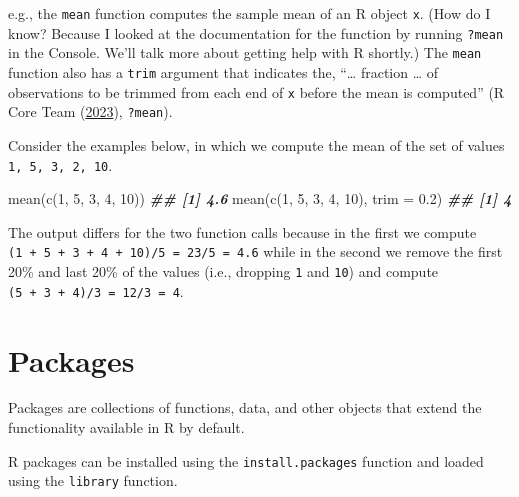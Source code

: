\documentclass[
]{book}
\newenvironment{Shaded}{\begin{snugshade}}{\end{snugshade}}
\newcommand{\AttributeTok}[1]{\textcolor[rgb]{0.77,0.63,0.00}{#1}}
\newcommand{\DecValTok}[1]{\textcolor[rgb]{0.00,0.00,0.81}{#1}}
\newcommand{\DocumentationTok}[1]{\textcolor[rgb]{0.56,0.35,0.01}{\textbf{\textit{#1}}}}
\newcommand{\FloatTok}[1]{\textcolor[rgb]{0.00,0.00,0.81}{#1}}
\newcommand{\FunctionTok}[1]{\textcolor[rgb]{0.00,0.00,0.00}{#1}}
\newcommand{\NormalTok}[1]{#1}
\theoremstyle{definition}
\theoremstyle{definition}
\theoremstyle{definition}
\theoremstyle{definition}
\theoremstyle{remark}
\begin{document}
e.g., the \texttt{mean} function computes the sample mean of an R object \texttt{x}. (How do I know? Because I looked at the documentation for the function by running \texttt{?mean} in the Console. We'll talk more about getting help with R shortly.) The \texttt{mean} function also has a \texttt{trim} argument that indicates the, ``\ldots{} fraction \ldots{} of observations to be trimmed from each end of \texttt{x} before the mean is computed'' (R Core Team (\protect\hyperlink{ref-R-base}{2023}), \texttt{?mean}).

Consider the examples below, in which we compute the mean of the set of values \texttt{1,\ 5,\ 3,\ 2,\ 10}.

\begin{Shaded}
\begin{Highlighting}[]
\FunctionTok{mean}\NormalTok{(}\FunctionTok{c}\NormalTok{(}\DecValTok{1}\NormalTok{, }\DecValTok{5}\NormalTok{, }\DecValTok{3}\NormalTok{, }\DecValTok{4}\NormalTok{, }\DecValTok{10}\NormalTok{))}
\DocumentationTok{\#\# [1] 4.6}
\FunctionTok{mean}\NormalTok{(}\FunctionTok{c}\NormalTok{(}\DecValTok{1}\NormalTok{, }\DecValTok{5}\NormalTok{, }\DecValTok{3}\NormalTok{, }\DecValTok{4}\NormalTok{, }\DecValTok{10}\NormalTok{), }\AttributeTok{trim =} \FloatTok{0.2}\NormalTok{)}
\DocumentationTok{\#\# [1] 4}
\end{Highlighting}
\end{Shaded}

The output differs for the two function calls because in the first we compute \texttt{(1\ +\ 5\ +\ 3\ +\ 4\ +\ 10)/5\ =\ 23/5\ =\ 4.6} while in the second we remove the first 20\% and last 20\% of the values (i.e., dropping \texttt{1} and \texttt{10}) and compute \texttt{(5\ +\ 3\ +\ 4)/3\ =\ 12/3\ =\ 4}.

\hypertarget{packages}{%
\section{Packages}\label{packages}}

Packages are collections of functions, data, and other objects that extend the functionality available in R by default.

R packages can be installed using the \texttt{install.packages} function and loaded using the \texttt{library} function.
\end{document}
